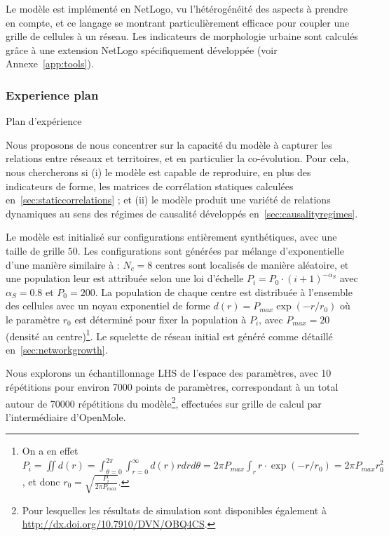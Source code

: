 Le modèle est implémenté en NetLogo, vu l'hétérogénéité des aspects à prendre en compte, et ce langage se montrant particulièrement efficace pour coupler une grille de cellules à un réseau. Les indicateurs de morphologie urbaine sont calculés grâce à une extension NetLogo spécifiquement développée (voir Annexe~\ref{app:tools}).


\subsubsection{Experience plan}{Plan d'expérience}

Nous proposons de nous concentrer sur la capacité du modèle à capturer les relations entre réseaux et territoires, et en particulier la co-évolution. Pour cela, nous chercherons si (i) le modèle est capable de reproduire, en plus des indicateurs de forme, les matrices de corrélation statiques calculées en~\ref{sec:staticcorrelations} ; et (ii) le modèle produit une variété de relations dynamiques au sens des régimes de causalité développés en~\ref{sec:causalityregimes}.

Le modèle est initialisé sur configurations entièrement synthétiques, avec une taille de grille $50$. Les configurations sont générées par mélange d'exponentielle d'une manière similaire à \cite{anas1998urban} : $N_c = 8$ centres sont localisés de manière aléatoire, et une population leur est attribuée selon une loi d'échelle $P_i = P_0\cdot (i+1)^{-\alpha_S}$ avec $\alpha_S = 0.8$ et $P_0 = 200$. La population de chaque centre est distribuée à l'ensemble des cellules avec un noyau exponentiel de forme $d(r) = P_{max}\exp\left( - r / r_0\right)$ où le paramètre $r_0$ est déterminé pour fixer la population à $P_i$, avec $P_{max} = 20$ (densité au centre)\footnote{On a en effet $P_i = \iint d(r) = \int_{\theta=0}^{2\pi} \int_{r=0}^{\infty} d(r) rdrd\theta = 2 \pi P_{max} \int_r r\cdot \exp\left( - r / r_0\right) = 2 \pi P_{max} r_0^2$, et donc $r_0 = \sqrt{\frac{P_i}{2\pi P_{max}}}$.}. Le squelette de réseau initial est généré comme détaillé en~\ref{sec:networkgrowth}.

Nous explorons un échantillonnage LHS de l'espace des paramètres, avec 10 répétitions pour environ 7000 points de paramètres, correspondant à un total autour de 70000 répétitions du modèle\footnote{Pour lesquelles les résultats de simulation sont disponibles également à \url{http://dx.doi.org/10.7910/DVN/OBQ4CS}.}, effectuées sur grille de calcul par l'intermédiaire d'OpenMole.



